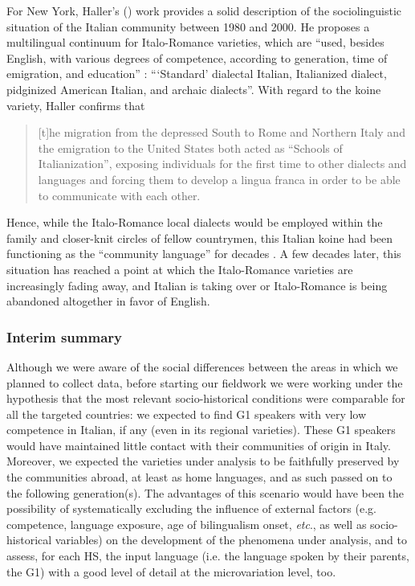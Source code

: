 \documentclass[output=paper,hidelinks]{langscibook}
\begin{document}
For New York, Haller’s (\citeyear{Haller1987, Haller1993, Haller1997a, Haller1997b, Haller2002}) work provides a solid description of the sociolinguistic situation of the Italian community between 1980 and 2000. He proposes a multilingual continuum for Italo-Romance varieties, which are ``used, besides English, with various degrees of competence, according to generation, time of emigration, and education'' \citep[396]{Haller1987}: ``‘Standard’ dialectal Italian, Italianized dialect, pidginized American Italian, and archaic dialects''. With regard to the koine variety, Haller confirms that 
\begin{quote}
    [t]he migration from the depressed South to Rome and Northern Italy and the emigration to the United States both acted as ``Schools of Italianization'', exposing individuals for the first time to other dialects and languages and forcing them to develop a lingua franca in order to be able to communicate with each other. \citep[393]{Haller1987}
\end{quote}
Hence, while the Italo-Romance local dialects would be employed within the family and closer-knit circles of fellow countrymen, this Italian koine had been functioning as the ``community language'' for decades \citep[401]{Haller1991, Haller1997a}. A few decades later, this situation has reached a point at which the Italo-Romance varieties are increasingly fading away, and Italian is taking over or Italo-Romance is being abandoned altogether in favor of English.

\subsubsection{Interim summary}

Although we were aware of the social differences between the areas in which we planned to collect data, before starting our fieldwork we were working under the hypothesis that the most relevant socio-historical conditions were comparable for all the targeted countries: we expected to find G1 speakers with very low competence in Italian, if any (even in its regional varieties). These G1 speakers would have maintained little contact with their communities of origin in Italy. Moreover, we expected the varieties under analysis to be faithfully preserved by the communities abroad, at least as home languages, and as such passed on to the following generation(s). The advantages of this scenario would have been the possibility of systematically excluding the influence of external factors (e.g. competence, language exposure, age of bilingualism onset, \textit{etc}., as well as socio-historical variables) on the development of the phenomena under analysis, and to assess, for each HS, the input language (i.e. the language spoken by their parents, the G1) with a good level of detail at the microvariation level, too. 
\end{document}
